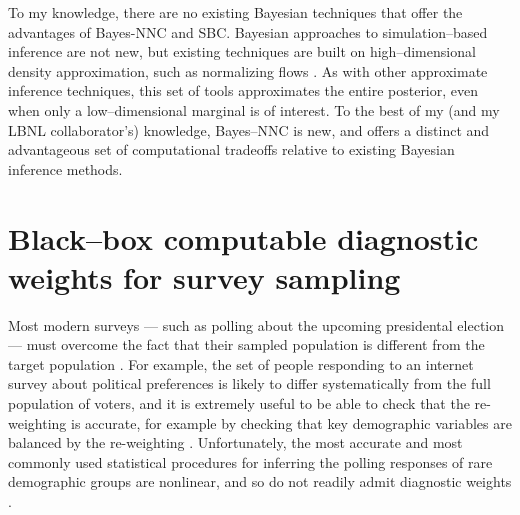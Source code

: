 To my knowledge, there are no existing Bayesian techniques that offer the
advantages of Bayes-NNC and SBC.  Bayesian approaches to simulation--based
inference are not new, but existing techniques are built on high--dimensional
density approximation, such as normalizing flows
\citep{cranmer:2020:frontierofsimulation,papamakarios:2021:normalizing}.  As
with other approximate inference techniques, this set of tools approximates the
entire posterior, even when only a low--dimensional marginal is of interest.  To
the best of my (and my LBNL collaborator's) knowledge, Bayes--NNC is new, and
offers a distinct and advantageous set of computational tradeoffs relative to
existing Bayesian inference methods.  




\section*{Black--box computable diagnostic weights for survey sampling}

Most modern surveys --- such as polling about the upcoming presidental election
--- must overcome the fact that their sampled population is different from the
target population \citep{gelman:2007:surveystruggles}.  For example, the set of
people responding to an internet survey about political preferences is likely to
differ systematically from the full population of voters, and it is extremely
useful to be able to check that the re-weighting is accurate, for example by
checking that key demographic variables are balanced by the re-weighting
\citep{li:2018:balancingcovariates,benmichael:2021:multilevel}. Unfortunately,
the most accurate and most commonly used statistical procedures for inferring
the polling responses of rare demographic groups are nonlinear, and so do not
readily admit diagnostic weights
\citep{gelman:1997:poststratification,gelman:2007:surveystruggles}. 

